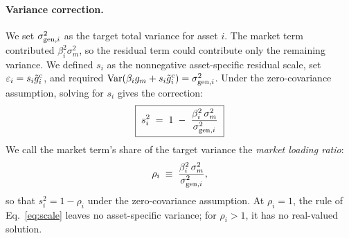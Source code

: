 \paragraph{Variance correction.}

We set $\sigma_{\mathrm{gen},i}^2$ as the target total variance for asset $i$.
The market term contributed $\beta_i^2\sigma_m^2$, so the residual term
could contribute only the remaining variance. We defined $s_i$ as the
nonnegative asset-specific residual scale, set
$\varepsilon_i=s_i\tilde{g}_i^{\mathrm c}$, and required
$\operatorname{Var}(\beta_i g_m+s_i\tilde{g}_i^{\mathrm c})=\sigma_{\mathrm{gen},i}^2$. Under the
zero-covariance assumption, solving for $s_i$ gives the correction:
\begin{equation}
  \boxed{\;s_i^2 \;=\; 1 \;-\; \frac{\beta_i^2\, \sigma_m^2}{\sigma_{\mathrm{gen},i}^2}\;}
  \label{eq:scale}
\end{equation}
We call the market term's share of the target variance the
\emph{market loading ratio}:
\begin{equation}
  \rho_i \;\equiv\; \frac{\beta_i^2\, \sigma_m^2}{\sigma_{\mathrm{gen},i}^2},
  \label{eq:rho}
\end{equation}
so that $s_i^2=1-\rho_i$ under the zero-covariance assumption. At
$\rho_i=1$, the rule of Eq.~\eqref{eq:scale} leaves no asset-specific
variance; for $\rho_i>1$, it has no real-valued solution.

